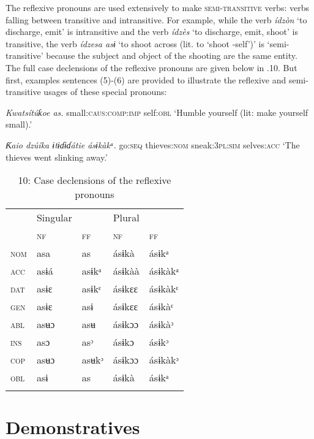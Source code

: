 The reflexive pronouns are used extensively to make \textsc{semi-transitive }verbs: verbs falling between transitive and intransitive. For example, while the verb \textit{ídzòn }‘to discharge, emit’ is intransitive and the verb \textit{ídzès }‘to discharge, emit, shoot’ is transitive, the verb \textit{ídzesa asɨ }‘to shoot across (lit. to ‘shoot -self’)’ is ‘semi-transitive’ because the subject and object of the shooting are the same entity. The full case declensions of the reflexive pronouns are given below in .10. But first, examples sentences (5)-(6) are provided to illustrate the reflexive and semi-transitive usages of these special pronouns:




\textit{Kwatsítúƙoe     as.}
small:\textsc{caus:comp:imp}   self:\textsc{obl}
‘Humble yourself (lit: make yourself small).’




\textit{Ƙ}\textit{aio     dzúíka   ɨtɨɗɨɗátie     ásɨkàkᵃ.}
go:\textsc{seq}   thieves:\textsc{nom}   sneak:\textsc{3pl:sim} selves:\textsc{acc}
‘The thieves went slinking away.’



\begin{table}
\caption{10: Case declensions of the reflexive pronouns}
\label{tab:5}


\begin{tabularx}{\textwidth}{XXXXX} & Singular &  & Plural & \\
\lsptoprule
& \textsc{nf} & \textsc{ff} & \textsc{nf} & \textsc{ff}\\
\textsc{nom} & asa & as & ásɨkà & ásɨkᵃ\\
\textsc{acc} & asɨá & asɨkᵃ & ásɨkàà & ásɨkàkᵃ\\
\textsc{dat} & asɨɛ & asɨkᵋ & ásɨkɛɛ & ásɨkàkᵋ\\
\textsc{gen} & asɨɛ & asɨ & ásɨkɛɛ & ásɨkàᵋ\\
\textsc{abl} & asʉɔ & asʉ & ásɨkɔɔ & ásɨkàᵓ\\
\textsc{ins} & asɔ & asᵓ & ásɨkɔ & ásɨkᵓ\\
\textsc{cop} & asʉɔ & asʉkᵓ & ásɨkɔɔ & ásɨkàkᵓ\\
\textsc{obl} & asɨ & as & ásɨkà & ásɨkᵃ\\
\lspbottomrule
\end{tabularx}
\end{table}


\section{Demonstratives}



